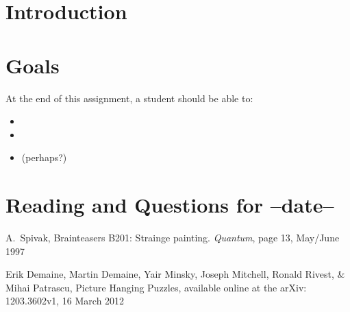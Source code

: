 \documentclass[12pt,letterpaper]{article}
\theoremstyle{definition}
\begin{document}
\setlength{\parskip}{1ex plus 0.5ex minus 0.2ex}
\setlength{\parindent}{0pt}

\pagestyle{fancy}
\cfoot{} 

\section*{Introduction}


\section*{Goals}
At the end of this assignment, a student should be able to:
\begin{itemize}
\item
\item
\item (perhaps?)
\end{itemize}

\section*{Reading and Questions for --date--}


\begin{thebibliography}{9}

    A.~Spivak,
    Brainteasers B201: Strainge painting.
    \emph{Quantum}, page 13,
    May/June 1997

    Erik Demaine, Martin Demaine, Yair Minsky, Joseph Mitchell, Ronald Rivest, \& Mihai Patrascu,
    Picture Hanging Puzzles,
    available online at the arXiv: 1203.3602v1,
    16 March 2012
 
 \end{thebibliography}
\end{document}
